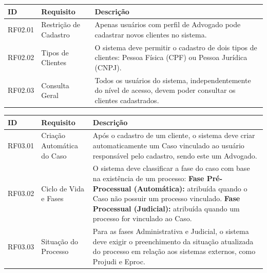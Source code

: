 \begin{quadro}[H]
\centering
\caption{Requisitos Funcionais - Módulo 02: Cadastro de Clientes}
\label{qua:rf-modulo02}
\renewcommand{\arraystretch}{1.3}
\begin{tabularx}{\textwidth}{|l|l|X|}
\hline
\textbf{ID} & \textbf{Requisito} & \textbf{Descrição} \\
\hline
RF02.01 & Restrição de Cadastro & Apenas usuários com perfil de Advogado pode cadastrar novos clientes no sistema. \\
\hline
RF02.02 & Tipos de Clientes & O sistema deve permitir o cadastro de dois tipos de clientes: Pessoa Física (CPF) ou Pessoa Jurídica (CNPJ). \\
\hline
RF02.03 & Consulta Geral & Todos os usuários do sistema, independentemente do nível de acesso, devem poder consultar os clientes cadastrados. \\
\hline
\end{tabularx}
\end{quadro}

\begin{quadro}[H]
\centering
\caption{Requisitos Funcionais - Módulo 03: Gerenciamento de Casos e Processos}
\label{qua:rf-modulo03}
\renewcommand{\arraystretch}{1.3}
\begin{tabularx}{\textwidth}{|l|l|X|}
\hline
\textbf{ID} & \textbf{Requisito} & \textbf{Descrição} \\
\hline
RF03.01 & Criação Automática do Caso & Após o cadastro de um cliente, o sistema deve criar automaticamente um Caso vinculado ao usuário responsável pelo cadastro, sendo este um Advogado. \\
\hline
RF03.02 & Ciclo de Vida e Fases & O sistema deve classificar a fase do caso com base na existência de um processo: \newline \textbf{Fase Pré-Processual (Automática):} atribuída quando o Caso não possuir um processo vinculado. \newline \textbf{Fase Processual (Judicial):} atribuída quando um processo for vinculado ao Caso. \\
\hline
RF03.03 & Situação do Processo & Para as fases Administrativa e Judicial, o sistema deve exigir o preenchimento da situação atualizada do processo em relação aos sistemas externos, como Projudi e Eproc. \\
\hline
\end{tabularx}
\end{quadro}

